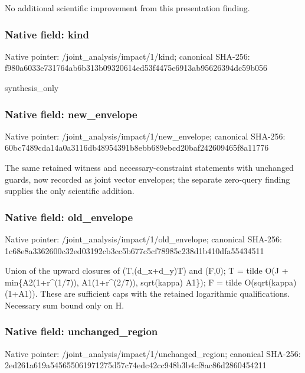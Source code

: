 \documentclass[10pt,a4paper]{article}
\begin{document}
\begingroup\raggedright\sloppy No additional scientific improvement from this presentation finding.\par\endgroup

\subsubsection{Native field: kind}
Native pointer: /joint\_\allowbreak{}analysis/impact/1/kind; canonical SHA-256: f980a6033e731764ab6b313b09320614ed53f4475e6913ab95626394dc59b056

\begingroup\raggedright\sloppy synthesis\_\allowbreak{}only\par\endgroup

\subsubsection{Native field: new\_\allowbreak{}envelope}
Native pointer: /joint\_\allowbreak{}analysis/impact/1/new\_\allowbreak{}envelope; canonical SHA-256: 60bc7489cda14a0a3116db48954391b8ebb689ebcd20baf242609465f8a11776

\begingroup\raggedright\sloppy The same retained witness and necessary-constraint statements with unchanged guards,\allowbreak{} now recorded as joint vector envelopes;\allowbreak{} the separate zero-query finding supplies the only scientific addition.\par\endgroup

\subsubsection{Native field: old\_\allowbreak{}envelope}
Native pointer: /joint\_\allowbreak{}analysis/impact/1/old\_\allowbreak{}envelope; canonical SHA-256: 1c68e8a3362600c32ed03192cb3cc5b677c5cf78985c238d1b410dfa55434511

\begingroup\raggedright\sloppy Union of the upward closures of (T,\allowbreak{}(d\_\allowbreak{}x+d\_\allowbreak{}y)T) and (F,\allowbreak{}0);\allowbreak{} T =\allowbreak{} tilde O(J + min\{A2(1+r\textasciicircum{}(1/\allowbreak{}7)),\allowbreak{} A1(1+r\textasciicircum{}(2/\allowbreak{}7)),\allowbreak{} sqrt(kappa) A1\});\allowbreak{} F =\allowbreak{} tilde O(sqrt(kappa)(1+A1)). These are sufficient caps with the retained logarithmic qualifications. Necessary sum bound only on H.\par\endgroup

\subsubsection{Native field: unchanged\_\allowbreak{}region}
Native pointer: /joint\_\allowbreak{}analysis/impact/1/unchanged\_\allowbreak{}region; canonical SHA-256: 2ed261a619a545655061971275d57c74edc42cc948b3b4cf8ac86d2860454211
\end{document}
